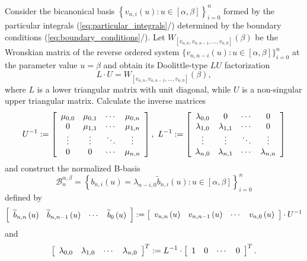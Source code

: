 \documentclass[b5paper, twosided]{book}
\DeclareRobustCommand{\mref}[1]{\ref{#1}{\relsize{-1}/\pageref{#1}}}
\begin{document}
Consider the bicanonical basis $\left\{v_{n,i}\left(u\right):u\in\left[\alpha,\beta\right]\right\}_{i=0}^{n}$ formed by the particular integrals (\mref{eq:particular_integrals}) determined by the boundary conditions (\mref{eq:boundary_conditions}). Let $W_{\left[v_{n,n},v_{n,n-1},\ldots,v_{n,0}\right]  }\left(  \beta\right)  $ be the Wronskian matrix of the reverse ordered system
$\{  v_{n,n-i}\left(  u\right)  :\allowbreak{}u\in\left[  \alpha,\beta\right]  \}
_{i=0}^{n}$ at the parameter value $u=\beta$ and obtain its Doolittle-type $LU$ factorization %
\begin{equation}
L\cdot U=W_{\left[  v_{n,n},v_{n,n-1},\ldots,v_{n,0}\right]  }\left(
\beta\right),
\label{eq:LU_factorization_of_reversed_system}
\end{equation}
where $L$ is a lower triangular matrix with unit diagonal,
while $U$ is a non-singular upper triangular matrix. Calculate the inverse matrices%
\[
U^{-1}:=\left[
\begin{array}
[c]{cccc}%
\mu_{0,0} & \mu_{0,1} & \cdots & \mu_{0,n}\\
0 & \mu_{1,1} & \cdots & \mu_{1,n}\\
\vdots & \vdots & \ddots & \vdots\\
0 & 0 & \cdots & \mu_{n,n}%
\end{array}
\right]  ,~L^{-1}:=\left[
\begin{array}
[c]{cccc}%
\lambda_{0,0} & 0 & \cdots & 0\\
\lambda_{1,0} & \lambda_{1,1} & \cdots & 0\\
\vdots & \vdots & \ddots & \vdots\\
\lambda_{n,0} & \lambda_{n,1} & \cdots & \lambda_{n,n}%
\end{array}
\right]
\]
and construct the normalized B-basis%
\begin{equation}
\mathcal{B}_{n}^{\alpha,\beta}=\left\{  b_{n,i}\left(  u\right)  =\lambda
_{n-i,0}\widetilde{b}_{n,i}\left(  u\right)  :u\in\left[  \alpha,\beta\right]
\right\}  _{i=0}^{n}\label{eq:construction}%
\end{equation}
defined by%
\[
\left[
\begin{array}
[c]{cccc}%
\widetilde{b}_{n,n}\left(  u\right)   & \widetilde{b}_{n,n-1}\left(
u\right)   & \cdots & \widetilde{b}_{0}\left(
u\right)
\end{array}
\right]  :=\left[
\begin{array}
[c]{cccc}%
v_{n,n}\left(  u\right)   & v_{n,n-1}\left(  u\right)   & \cdots &
v_{n,0}\left(  u\right)
\end{array}
\right]  \cdot U^{-1}%
\]
and%
\[
\left[
\begin{array}
[c]{cccc}%
\lambda_{0,0} & \lambda_{1,0} & \cdots & \lambda_{n,0}%
\end{array}
\right]  ^{T}:=L^{-1}\cdot\left[
\begin{array}
[c]{cccc}%
1 & 0 & \cdots & 0
\end{array}
\right]  ^{T}.
\]
\end{document}
